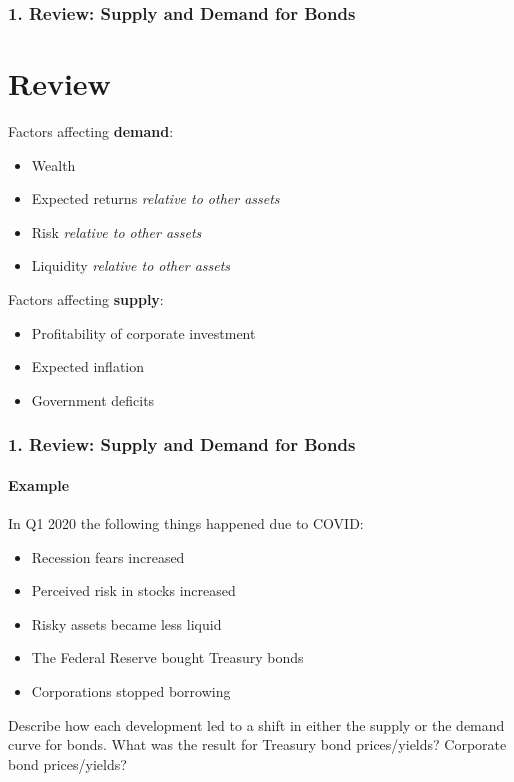 \documentclass{beamer}
\begin{document}
\begin{frame}[t]
    \frametitle{1. Review: Supply and Demand for Bonds}
    \section{Review}

    Factors affecting \textbf{demand}:
    \begin{itemize}
        \item Wealth
        \item Expected returns \textit{relative to other assets}
        \item Risk \textit{relative to other assets}
        \item Liquidity \textit{relative to other assets}
    \end{itemize}
    
    \vspace{2em}

    Factors affecting \textbf{supply}:
    \begin{itemize}
        \item Profitability of corporate investment
        \item Expected inflation
        \item Government deficits
    \end{itemize}

\end{frame}

\begin{frame}[t]
    \frametitle{1. Review: Supply and Demand for Bonds}
    \framesubtitle{Example}

    In Q1 2020 the following things happened due to COVID:
    \begin{itemize}
        \item Recession fears increased
        \item Perceived risk in stocks increased
        \item Risky assets became less liquid
        \item The Federal Reserve bought Treasury bonds
        \item Corporations stopped borrowing
    \end{itemize}

    \vspace{1em}

    Describe how each development led to a shift in either the supply or the demand curve for bonds.   What was the result for Treasury bond prices/yields?  Corporate bond prices/yields?  

\end{frame}
\end{document}
